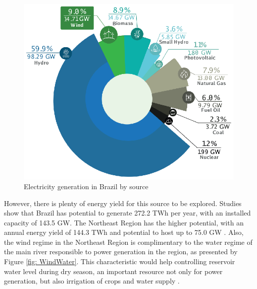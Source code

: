 \begin{figure}[b]
	\caption{Electricity generation in Brazil by source}
	\begin{center}
		\includegraphics[scale=0.75]{Images/BRshare19.eps}
	\end{center}
	\label{fig: BRshare}
\end{figure}

However, there is plenty of energy yield for this source to be explored. Studies show that Brazil has potential to generate 272.2 TWh per year, with an installed capacity of 143.5 GW. The Northeast Region has the higher potential, with an annual energy yield of 144.3 TWh and potential to host up to 75.0 GW \cite{Atlas2001}. Also, the wind regime in the Northeast Region is complimentary to the water regime of the main river responsible to power generation in the region, as presented by Figure \ref{fig: WindWater}. This characteristic would help controlling reservoir water level during dry season, an important resource not only for power generation, but also irrigation of crops and water supply \cite{ANEEL2005}.

